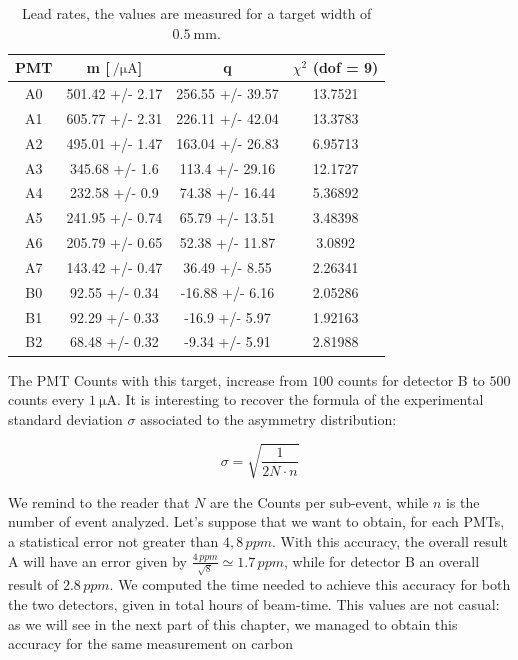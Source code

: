 \begin{table}[]
\centering
\begin{tabular}{cccc}
\hline
 PMT   & m [$\SI{}{ \per \micro \ampere}$]          & q                &  $\chi^{2}$ (dof = 9) \\
\hline
 A0    & 501.42 +/- 2.17 & 256.55 +/- 39.57 & 13.7521  \\
 A1    & 605.77 +/- 2.31 & 226.11 +/- 42.04 & 13.3783  \\
 A2    & 495.01 +/- 1.47 & 163.04 +/- 26.83 &  6.95713 \\
 A3    & 345.68 +/- 1.6  & 113.4 +/- 29.16  & 12.1727  \\
 A4    & 232.58 +/- 0.9  & 74.38 +/- 16.44  &  5.36892 \\
 A5    & 241.95 +/- 0.74 & 65.79 +/- 13.51  &  3.48398 \\
 A6    & 205.79 +/- 0.65 & 52.38 +/- 11.87  &  3.0892  \\
 A7    & 143.42 +/- 0.47 & 36.49 +/- 8.55   &  2.26341 \\
 B0    & 92.55 +/- 0.34  & -16.88 +/- 6.16  &  2.05286 \\
 B1    & 92.29 +/- 0.33  & -16.9 +/- 5.97   &  1.92163 \\
 B2    & 68.48 +/- 0.32  & -9.34 +/- 5.91   &  2.81988 \\
\hline
\end{tabular}
\caption{Lead rates, the values are measured for a target width of $\SI{0.5}{\milli \meter}$.}
\end{table}

The PMT Counts with this target, increase from $100$ counts for detector B to $500$ counts every $\SI{1}{\micro \ampere}$. It is interesting to recover the formula of the experimental standard deviation $\sigma$ associated to the asymmetry distribution:

\begin{equation}
\sigma = \sqrt{\dfrac{1}{2 N \cdot n}}
\end{equation}

We remind to the reader that $N$ are the Counts per sub-event, while  $n$ is the number of event analyzed.
Let's suppose that we want to obtain, for each PMTs, a statistical error not greater than $4,8 \, ppm$. With this accuracy, the overall result A will have an error given by $\frac{4 \, ppm}{\sqrt{8}} \simeq 1.7 \, ppm$, while for detector B an overall result of $2.8 \, ppm$.
We computed the time needed to achieve this accuracy for both the two detectors, given in total hours of beam-time. This values are not casual: as we will see in the next part of this chapter, we managed to obtain this accuracy for the same measurement on carbon  

